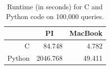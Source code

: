 \begin{table}[h]
	\begin{center}
	\begin{tabular}{|r|r|r|}
	\hline
	   & \multicolumn{1}{|c|}{PI}     & \multicolumn{1}{|c|}{MacBook} \\
	\hline
	C      & 84.748   & 4.782     \\
	\hline
	Python & 2046.768 & 49.411    \\
	\hline
	\end{tabular}
	\caption{Runtime (in seconds) for C and Python code on 100,000 queries.}
	\label{tbl:runtimes_ports}
	\end{center}
\end{table}
